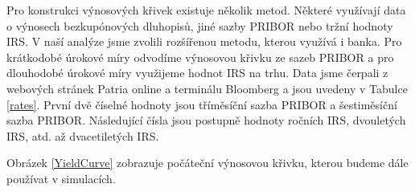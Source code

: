 \documentclass[a4paper,12pt]{report}
\theoremstyle{definition} \newtheorem{definice}[veta]{Definice}
\theoremstyle{remark}
\begin{document}
Pro konstrukci výnosových křivek existuje několik metod.
Některé využívají data o výnosech bezkupónových dluhopisů, jiné sazby PRIBOR nebo tržní hodnoty IRS.
V naší analýze jsme zvolili rozšířenou metodu, kterou využívá i banka. 
Pro krátkodobé úrokové míry odvodíme výnosovou křivku ze sazeb PRIBOR a pro dlouhodobé úrokové míry využijeme hodnot IRS na trhu.
Data jsme čerpali z webových stránek Patria online a terminálu Bloomberg a jsou uvedeny v Tabulce \ref{rates}.
První dvě číselné hodnoty jsou tříměsíční sazba PRIBOR a šestiměsíční sazba PRIBOR. 
Následující čísla jsou postupně hodnoty ročních IRS, dvouletých IRS, atd. až dvacetiletých IRS. 
\begin{table}%
  \centering 
\caption{Počáteční úrokové míry}%
\label{rates}
\vspace{5mm}
\end{table}
Obrázek \ref{YieldCurve} zobrazuje počáteční výnosovou křivku, kterou budeme dále používat v simulacích.
\end{document}
